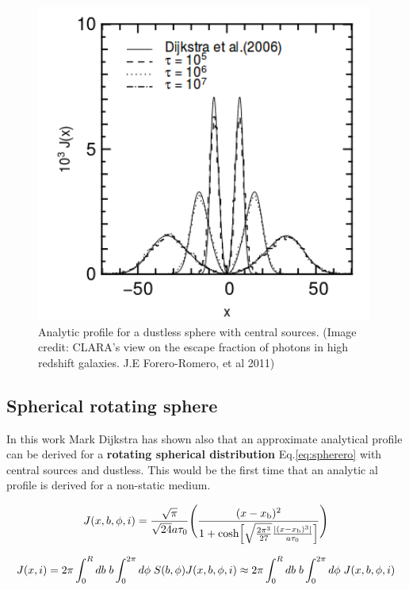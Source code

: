\begin{figure}[H]\label{fig:sphere}
\begin{center}
\includegraphics[scale=0.4]{../Figures/Sphere.png}
\end{center}\caption{Analytic profile for a dustless sphere with central \ly sources.  (Image credit: CLARA's view on the escape fraction of \ly photons in high redshift galaxies. J.E Forero-Romero, et al 2011)}
\end{figure}

\subsection{Spherical rotating sphere}

In this work Mark Dijkstra has shown also that an approximate analytical profile
can be derived for a {\bf{rotating spherical distribution}} Eq.\ref{eq:spherero}
with central sources and dustless. This would be the first time that an analytic
al profile is derived for a non-static medium.  

\begin{equation}\label{eq:spherero}
J(x,b,\phi,i)=\frac{\sqrt{\pi}}{\sqrt{24}a\tau_0}\Bigg{(}\frac{(x-x_{\rm
b})^2}{1+{\rm cosh}\Big{[}\sqrt{\frac{2\pi^3}{27}}\frac{|(x
-x_{\rm b})^3|}{a\tau_0}\Big{]}}\Bigg{)}
\end{equation}

\begin{equation}
J(x,i)=2\pi \int_0^Rdb {\hspace{1mm}} b \int_0^{2\pi}d\phi {\hspace{1mm}}
S(b,\phi)J(x,b,\phi,i) \approx 2\pi \int_0^Rdb {\hspace{1mm}} b
\int_0^{2\pi}d\phi {\hspace{1mm}} J(x,b,\phi,i)\\ \nonumber
\end{equation}

